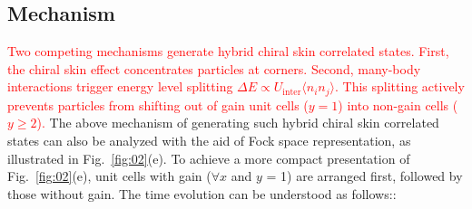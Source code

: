 \documentclass[longbibliography, aps, prx, amsmath, amssymb, amsfonts, twocolumn,superscriptaddress, footinbib]{revtex4-1}
\begin{document}
	\subsection{Mechanism}
	\textcolor{red}{
		Two competing mechanisms generate hybrid chiral skin correlated states. First, the chiral skin effect concentrates particles at corners. Second, many-body interactions trigger energy level splitting $\Delta E \propto U_{\text{inter}}\langle n_i n_j \rangle$. This splitting actively prevents particles from shifting out of gain unit cells (\(y = 1\)) into non-gain cells (\(y \ge 2\)).
	}
	The above mechanism of generating such hybrid chiral skin correlated states can also be analyzed with the aid of Fock space representation, as illustrated in Fig.~\ref{fig:02}(e). 
	To achieve a more compact presentation of Fig.~\ref{fig:02}(e), unit cells with gain ($\forall x$ and $y$ = 1) are arranged first, followed by those without gain. The time evolution can be understood as follows::
\end{document}
